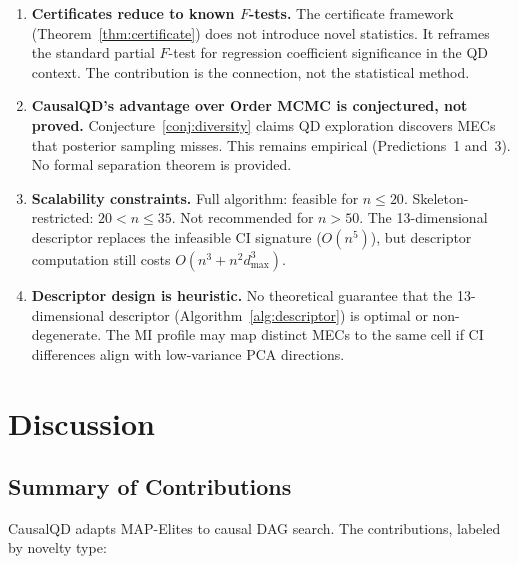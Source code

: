 \documentclass{article}
\theoremstyle{definition}
\theoremstyle{plain}
\theoremstyle{remark}
\begin{document}
\begin{enumerate}
  \item \textbf{Certificates reduce to known $F$-tests.}
    The certificate framework (Theorem~\ref{thm:certificate}) does not introduce
    novel statistics. It reframes the standard partial $F$-test for regression
    coefficient significance in the QD context. The contribution is the
    connection, not the statistical method.

  \item \textbf{CausalQD's advantage over Order MCMC is conjectured, not proved.}
    Conjecture~\ref{conj:diversity} claims QD exploration discovers MECs that
    posterior sampling misses. This remains empirical
    (Predictions~1 and~3). No formal separation theorem is provided.

  \item \textbf{Scalability constraints.}
    Full algorithm: feasible for $n \leq 20$. Skeleton-restricted: $20 < n \leq 35$.
    Not recommended for $n > 50$. The 13-dimensional descriptor replaces the
    infeasible CI signature ($O(n^5)$), but descriptor computation still costs
    $O(n^3 + n^2 d_{\max}^3)$.

  \item \textbf{Descriptor design is heuristic.}
    No theoretical guarantee that the 13-dimensional descriptor
    (Algorithm~\ref{alg:descriptor}) is optimal or non-degenerate. The MI profile
    may map distinct MECs to the same cell if CI differences align with low-variance
    PCA directions.
\end{enumerate}


\section{Discussion}
\label{sec:discussion}

\subsection{Summary of Contributions}

CausalQD adapts MAP-Elites to causal DAG search. The contributions, labeled by
novelty type:
\end{document}
